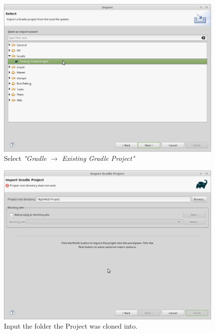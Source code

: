 \begin{figure}[H]
	\includegraphics[width=\textwidth]{setup-parts/pictures/eclipse-import-3.png}
	\caption{Select \textit{"Gradle $\rightarrow$ Existing Gradle Project"}}
\end{figure}

\begin{figure}[H]
	\includegraphics[width=\textwidth]{setup-parts/pictures/eclipse-import-4a.png}
	\caption{Input the folder the Project was cloned into.}
\end{figure}

